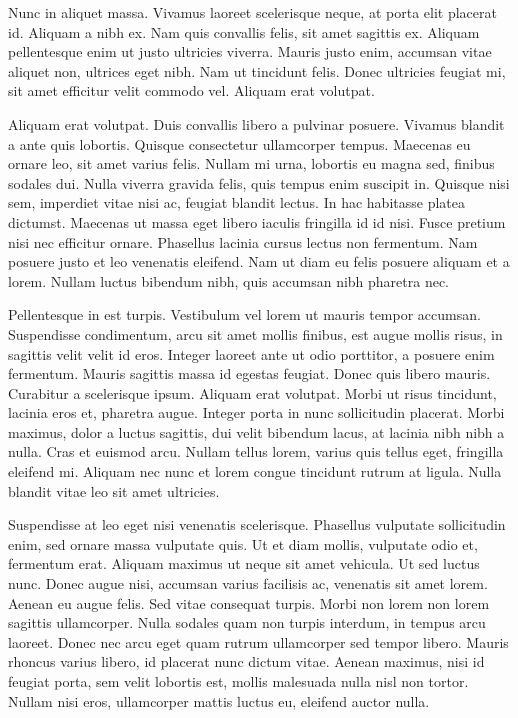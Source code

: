 Nunc in aliquet massa. Vivamus laoreet scelerisque neque, at porta elit placerat id. Aliquam a nibh ex. Nam quis convallis felis, sit amet sagittis ex. Aliquam pellentesque enim ut justo ultricies viverra. Mauris justo enim, accumsan vitae aliquet non, ultrices eget nibh. Nam ut tincidunt felis. Donec ultricies feugiat mi, sit amet efficitur velit commodo vel. Aliquam erat volutpat.

Aliquam erat volutpat. Duis convallis libero a pulvinar posuere. Vivamus blandit a ante quis lobortis. Quisque consectetur ullamcorper tempus. Maecenas eu ornare leo, sit amet varius felis. Nullam mi urna, lobortis eu magna sed, finibus sodales dui. Nulla viverra gravida felis, quis tempus enim suscipit in. Quisque nisi sem, imperdiet vitae nisi ac, feugiat blandit lectus. In hac habitasse platea dictumst. Maecenas ut massa eget libero iaculis fringilla id id nisi. Fusce pretium nisi nec efficitur ornare. Phasellus lacinia cursus lectus non fermentum. Nam posuere justo et leo venenatis eleifend. Nam ut diam eu felis posuere aliquam et a lorem. Nullam luctus bibendum nibh, quis accumsan nibh pharetra nec.

Pellentesque in est turpis. Vestibulum vel lorem ut mauris tempor accumsan. Suspendisse condimentum, arcu sit amet mollis finibus, est augue mollis risus, in sagittis velit velit id eros. Integer laoreet ante ut odio porttitor, a posuere enim fermentum. Mauris sagittis massa id egestas feugiat. Donec quis libero mauris. Curabitur a scelerisque ipsum. Aliquam erat volutpat. Morbi ut risus tincidunt, lacinia eros et, pharetra augue. Integer porta in nunc sollicitudin placerat. Morbi maximus, dolor a luctus sagittis, dui velit bibendum lacus, at lacinia nibh nibh a nulla. Cras et euismod arcu. Nullam tellus lorem, varius quis tellus eget, fringilla eleifend mi. Aliquam nec nunc et lorem congue tincidunt rutrum at ligula. Nulla blandit vitae leo sit amet ultricies.

Suspendisse at leo eget nisi venenatis scelerisque. Phasellus vulputate sollicitudin enim, sed ornare massa vulputate quis. Ut et diam mollis, vulputate odio et, fermentum erat. Aliquam maximus ut neque sit amet vehicula. Ut sed luctus nunc. Donec augue nisi, accumsan varius facilisis ac, venenatis sit amet lorem. Aenean eu augue felis. Sed vitae consequat turpis. Morbi non lorem non lorem sagittis ullamcorper. Nulla sodales quam non turpis interdum, in tempus arcu laoreet. Donec nec arcu eget quam rutrum ullamcorper sed tempor libero. Mauris rhoncus varius libero, id placerat nunc dictum vitae. Aenean maximus, nisi id feugiat porta, sem velit lobortis est, mollis malesuada nulla nisl non tortor. Nullam nisi eros, ullamcorper mattis luctus eu, eleifend auctor nulla.

